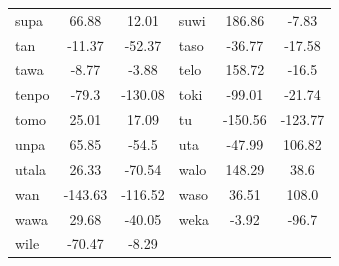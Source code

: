 \documentclass[14pt, a4paper]{extreport}
\begin{document}
\begin{longtable}{lcclcc}
supa & 66.88 & 12.01 & suwi & 186.86 & -7.83 \\
tan & -11.37 & -52.37 & taso & -36.77 & -17.58 \\
tawa & -8.77 & -3.88 & telo & 158.72 & -16.5 \\
tenpo & -79.3 & -130.08 & toki & -99.01 & -21.74 \\
tomo & 25.01 & 17.09 & tu & -150.56 & -123.77 \\
unpa & 65.85 & -54.5 & uta & -47.99 & 106.82 \\
utala & 26.33 & -70.54 & walo & 148.29 & 38.6 \\
wan & -143.63 & -116.52 & waso & 36.51 & 108.0 \\
wawa & 29.68 & -40.05 & weka & -3.92 & -96.7 \\
wile & -70.47 & -8.29 \\
\end{longtable}
\end{document}
